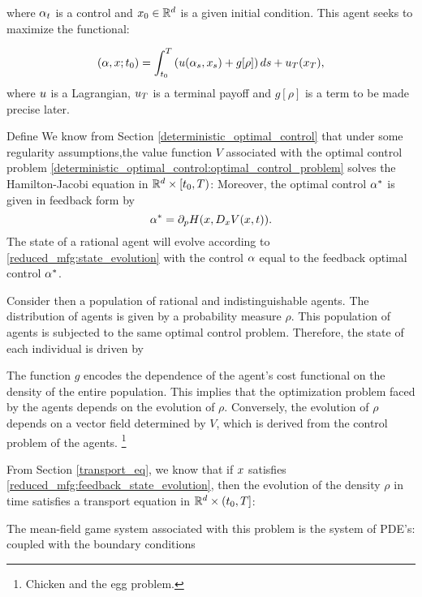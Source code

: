 \documentclass{article}
\begin{document}
where $\alpha_t$ is a control and $x_0\in\mathbb{R}^d$ is a given initial condition. This agent seeks to maximize the functional:

\begin{equation}\label{reduced_mfg:payoff_functional}
({ \alpha},x; t_0) = \int_{t_0}^T \left(u({ \alpha}_s,{ x}_s) + g[\rho] \right) ds + u_T({ x}_T),
\end{equation}
where $u$ is a Lagrangian, $u_T$ is a terminal payoff and $g[\rho]$ is a term to be made precise later. 

Define
We know from Section
\eqref{deterministic_optimal_control}
that under some regularity assumptions,the value function $V$ associated with
the optimal control problem
\eqref{deterministic_optimal_control:optimal_control_problem} 
solves the Hamilton-Jacobi equation in $\mathbb{R}^d \times [t_0,T)$:
Moreover, the optimal control $\alpha^*$ is given in feedback form by
$$\alpha^* = \partial_p H(x, D_x V(x, t)).$$
The state of a rational agent will evolve according to 
\eqref{reduced_mfg:state_evolution} with the control $\alpha$ equal to the feedback optimal control $\alpha^*$.

Consider then a population of rational and indistinguishable agents.
The distribution of agents is given by a probability measure $\rho$.
This population of agents is subjected to the same optimal control problem.
Therefore, the state of each individual is driven by

The function $g$ encodes the dependence of the agent's cost functional on the density of the entire population.
This implies that the optimization problem faced by the agents depends on the evolution of $\rho$.
Conversely, the evolution of $\rho$ depends on a vector field determined by $V$, which is derived from the control problem of the agents.
\footnote{Chicken and the egg problem.}

From Section
\eqref{transport_eq},
we know that if $x$ satisfies
\eqref{reduced_mfg:feedback_state_evolution},
then the evolution of the density $\rho$ in time satisfies a transport equation in $\mathbb{R}^d \times (t_0, T]$:

The mean-field game system associated with this problem is the system of PDE's:
coupled with the boundary conditions
\end{document}
